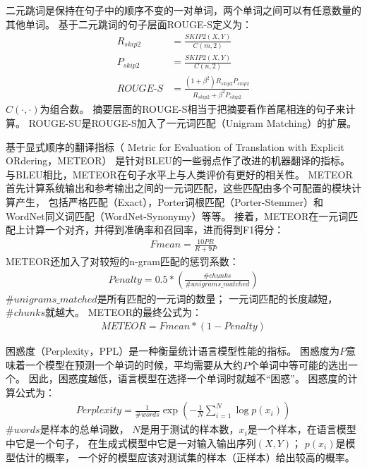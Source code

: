 二元跳词是保持在句子中的顺序不变的一对单词，两个单词之间可以有任意数量的其他单词。
基于二元跳词的句子层面ROUGE-S定义为：
\begin{align}
    R_{skip2} &= \frac{\textit{SKIP2}(X, Y)}{C(m, 2)} \\
    P_{skip2} &= \frac{\textit{SKIP2}(X, Y)}{C(n, 2)} \\
    \textit{ROUGE-S} &= \frac{(1 + \beta^2) R_{skip2}P_{skip2}}{R_{skip2} + \beta^2 P_{skip2}}
\end{align}
$C(\cdot, \cdot)$为组合数。
摘要层面的ROUGE-S相当于把摘要看作首尾相连的句子来计算。
ROUGE-SU是ROUGE-S加入了一元词匹配（Unigram Matching）的扩展。

基于显式顺序的翻译指标（
Metric for Evaluation of Translation with Explicit ORdering，METEOR）
是针对BLEU的一些弱点作了改进的机器翻译的指标。
与BLEU相比，METEOR在句子水平上与人类评价有更好的相关性。
METEOR首先计算系统输出和参考输出之间的一元词匹配，这些匹配由多个可配置的模块计算产生，
包括严格匹配（Exact），Porter词根匹配（Porter-Stemmer）和WordNet同义词匹配（WordNet-Synonymy）等等。
接着，METEOR在一元词匹配上计算一个对齐，并得到准确率和召回率，进而得到F1得分：
\begin{align}
    \textit{Fmean} = \frac{10PR}{R + 9P}
\end{align}
METEOR还加入了对较短的n-gram匹配的惩罚系数：
\begin{align}
    \textit{Penalty} = 0.5 * \left( \frac{\#chunks}{\#unigrams\_matched} \right)
\end{align}
$\#unigrams\_matched$是所有匹配的一元词的数量；
一元词匹配的长度越短，$\#chunks$就越大。
METEOR的最终公式为：
\begin{align}
    \textit{METEOR} = \textit{Fmean} * (1 - \textit{Penalty})
\end{align}

困惑度（Perplexity，PPL）是一种衡量统计语言模型性能的指标。
困惑度为$P$意味着一个模型在预测一个单词的时候，平均需要从大约$P$个单词中等可能的选出一个。
因此，困惑度越低，语言模型在选择一个单词时就越不“困惑”。
困惑度的计算公式为：
\begin{align}
    \textit{Perplexity} = \frac{1}{\#\textit{words}} \exp(-\frac{1}{N} \sum_{i=1}^N \log p(x_i))
\end{align}
$\#words$是样本的总单词数，
$N$是用于测试的样本数，$x_i$是一个样本，在语言模型中它是一个句子，
在生成式模型中它是一对输入输出序列$(X, Y)$；
$p(x_i)$是模型估计的概率，
一个好的模型应该对测试集的样本（正样本）给出较高的概率。


